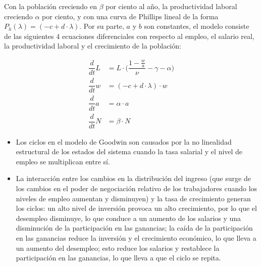 \documentclass[12pt,a4paper]{article}
\begin{document}
\pagebreak
Con la población creciendo en $\beta$ por ciento al año, la productividad laboral creciendo $\alpha$ por ciento, y con una curva de Phillips lineal de la forma $P_h(\lambda)=(-c+d\cdot\lambda)$. Por su parte, $a$ y $b$ son constantes, el modelo consiste de las siguientes 4 ecuaciones diferenciales con respecto al empleo, el salario real, la productividad laboral y el crecimiento de la población:

\begin{align*}
\dfrac{d}{dt}L &= L \cdot \Big(\dfrac{1-\frac{w}{a}}{\nu}- \gamma - \alpha \Big)\\[1em]
\dfrac{d}{dt} w &= (-c+d \cdot \lambda) \cdot w \\[1em]
\dfrac{d}{dt} a &= \alpha \cdot a \\[1em]
\dfrac{d}{dt} N &= \beta \cdot N
\end{align*}

\begin{itemize}
\item Los ciclos en el modelo de Goodwin son causados por la no linealidad estructural de los estados del sistema cuando la tasa salarial y el nivel de empleo se multiplican entre sí. 
\item La interacción entre los cambios en la distribución del ingreso (que surge de los cambios en el poder de negociación relativo de los trabajadores cuando los niveles de empleo aumentan y disminuyen) y la tasa de crecimiento generan los ciclos: un alto nivel de inversión provoca un alto crecimiento, por lo que el desempleo disminuye, lo que conduce a un aumento de los salarios y una disminución de la participación en las ganancias; la caída de la participación en las ganancias reduce la inversión y el crecimiento económico, lo que lleva a un aumento del desempleo; esto reduce los salarios y restablece la participación en las ganancias, lo que lleva a que el ciclo se repita. 
\end{itemize}


\end{document}
